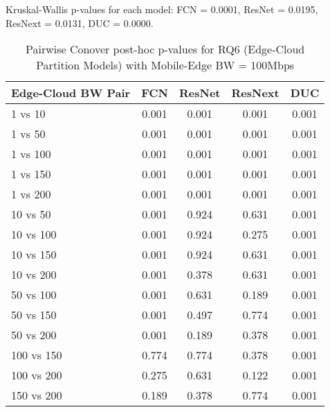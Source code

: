 \begin{table}[h]
\centering
\caption{Pairwise Conover post-hoc p-values for RQ6 (Edge-Cloud Partition Models) with Mobile-Edge BW = 100Mbps}
\label{tab:conover_edge_cloud_partition_me100}
\smallskip
Kruskal-Wallis p-values for each model: FCN = 0.0001, ResNet = 0.0195, ResNext = 0.0131, DUC = 0.0000.

\begin{tabular}{lcccc}
\toprule
Edge-Cloud BW Pair & FCN & ResNet & ResNext & DUC \\
\midrule
1 vs 10 & 0.001 & 0.001 & 0.001 & 0.001 \\
1 vs 50 & 0.001 & 0.001 & 0.001 & 0.001 \\
1 vs 100 & 0.001 & 0.001 & 0.001 & 0.001 \\
1 vs 150 & 0.001 & 0.001 & 0.001 & 0.001 \\
1 vs 200 & 0.001 & 0.001 & 0.001 & 0.001 \\
10 vs 50 & 0.001 & 0.924 & 0.631 & 0.001 \\
10 vs 100 & 0.001 & 0.924 & 0.275 & 0.001 \\
10 vs 150 & 0.001 & 0.924 & 0.631 & 0.001 \\
10 vs 200 & 0.001 & 0.378 & 0.631 & 0.001 \\
50 vs 100 & 0.001 & 0.631 & 0.189 & 0.001 \\
50 vs 150 & 0.001 & 0.497 & 0.774 & 0.001 \\
50 vs 200 & 0.001 & 0.189 & 0.378 & 0.001 \\
100 vs 150 & 0.774 & 0.774 & 0.378 & 0.001 \\
100 vs 200 & 0.275 & 0.631 & 0.122 & 0.001 \\
150 vs 200 & 0.189 & 0.378 & 0.774 & 0.001 \\
\bottomrule
\end{tabular}
\end{table}

